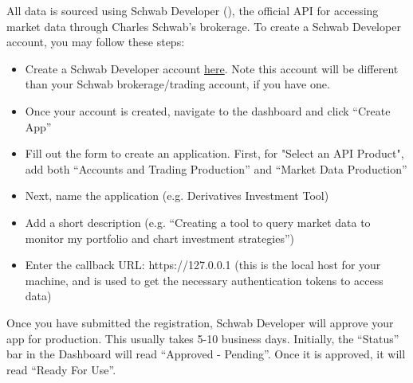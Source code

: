 \documentclass{article}
\begin{document}
\indent All data is sourced using Schwab Developer (\cite{schwab_developer}), the official API for accessing market data through Charles Schwab's brokerage. To create a Schwab Developer account, you may follow these steps: 

\begin{itemize}
    \item Create a Schwab Developer account \href{https://developer.schwab.com/register}{here}. Note this account will be different than your Schwab brokerage/trading account, if you have one. 
    \item Once your account is created, navigate to the dashboard and click \enquote{Create App}
    \item Fill out the form to create an application. First, for "Select an API Product", add both \enquote{Accounts and Trading Production} and \enquote{Market Data Production} 
    \item Next, name the application (e.g. Derivatives Investment Tool)
    \item Add a short description (e.g. \enquote{Creating a tool to query market data to monitor my portfolio and chart investment strategies})
    \item Enter the callback URL: https://127.0.0.1 (this is the local host for your machine, and is used to get the necessary authentication tokens to access data)

\end{itemize}

\indent Once you have submitted the registration, Schwab Developer will approve your app for production. This usually takes 5-10 business days. Initially, the \enquote{Status} bar in the Dashboard will read \enquote{Approved - Pending}. Once it is approved, it will read \enquote{Ready For Use}. 
\end{document}
